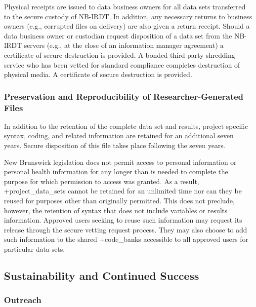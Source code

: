 \documentclass[
]{WileySix}
\begin{document}
Physical receipts are issued to data business owners for all data sets transferred to the secure custody of NB-IRDT. In addition, any necessary returns to business owners (e.g., corrupted files on delivery) are also given a return receipt. Should a data business owner or custodian request disposition of a data set from the NB-IRDT servers (e.g., at the close of an information manager agreement) a certificate of secure destruction is provided. A bonded third-party shredding service who has been vetted for standard compliance completes destruction of physical media. A certificate of secure destruction is provided.

\hypertarget{preservation-and-reproducibility-of-researcher-generated-files-1}{%
\subsubsection{Preservation and Reproducibility of Researcher-Generated Files}\label{preservation-and-reproducibility-of-researcher-generated-files-1}}

In addition to the retention of the complete data set and results, project specific syntax, coding, and related information are retained for an additional seven years. Secure disposition of this file takes place following the seven years.

New Brunswick legislation does not permit access to personal information or personal health information for any longer than is needed to complete the purpose for which permission to access was granted. As a result, +project\_data\_sets\textbar{} cannot be retained for an unlimited time nor can they be reused for purposes other than originally permitted. This does not preclude, however, the retention of syntax that does not include variables or results information. Approved users seeking to reuse such information may request its release through the secure vetting request process. They may also choose to add such information to the shared +code\_banks\textbar{} accessible to all approved users for particular data sets.

\hypertarget{sustainability-and-continued-success-2}{%
\subsection{Sustainability and Continued Success}\label{sustainability-and-continued-success-2}}

\hypertarget{outreach-2}{%
\subsubsection{Outreach}\label{outreach-2}}
\end{document}
